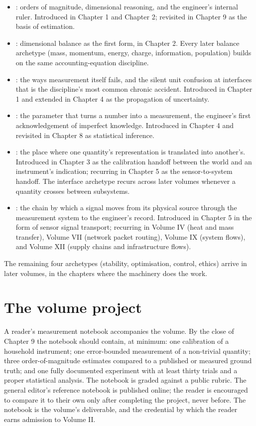 \begin{itemize}[leftmargin=*]
  \item {}: orders of magnitude, dimensional reasoning,
    and the engineer's internal ruler. Introduced in Chapter 1 and
    Chapter 2; revisited in Chapter 9 as the basis of estimation.
  \item {}: dimensional balance as the first form, in
    Chapter 2. Every later balance archetype (mass, momentum, energy,
    charge, information, population) builds on the same
    accounting-equation discipline.
  \item {}: the ways measurement itself fails, and the
    silent unit confusion at interfaces that is the discipline's
    most common chronic accident. Introduced in Chapter 1 and
    extended in Chapter 4 as the propagation of uncertainty.
  \item {}: the parameter that turns a number into
    a measurement, the engineer's first acknowledgement of
    imperfect knowledge. Introduced in Chapter 4 and revisited in
    Chapter 8 as statistical inference.
  \item {}: the place where one quantity's
    representation is translated into another's. Introduced in
    Chapter 3 as the calibration handoff between the world and an
    instrument's indication; recurring in Chapter 5 as the
    sensor-to-system handoff. The interface archetype recurs across
    later volumes whenever a quantity crosses between subsystems.
  \item {}: the chain by which a signal moves from
    its physical source through the measurement system to the
    engineer's record. Introduced in Chapter 5 in the form of
    sensor signal transport; recurring in Volume IV (heat and mass
    transfer), Volume VII (network packet routing), Volume IX
    (system flows), and Volume XII (supply chains and infrastructure
    flows).
\end{itemize}

The remaining four archetypes (stability, optimisation, control,
ethics) arrive in later volumes, in the chapters where the
machinery does the work.

\section*{The volume project}

A reader's measurement notebook accompanies the volume. By the close
of Chapter 9 the notebook should contain, at minimum: one calibration
of a household instrument; one error-bounded measurement of a
non-trivial quantity; three order-of-magnitude estimates compared to
a published or measured ground truth; and one fully documented
experiment with at least thirty trials and a proper statistical
analysis. The notebook is graded against a public rubric. The general
editor's reference notebook is published online; the reader is
encouraged to compare it to their own only after completing the
project, never before. The notebook is the volume's deliverable, and
the credential by which the reader earns admission to Volume II.

